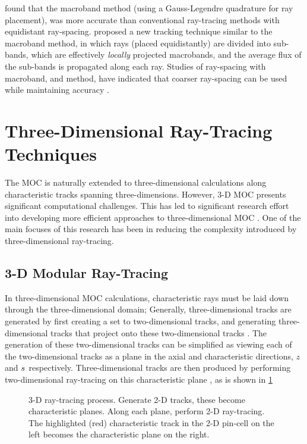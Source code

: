 {{        \citet{Yamamoto2005} found that the macroband method (using a Gauss-Legendre quadrature for ray placement), was more accurate than conventional ray-tracing methods with equidistant ray-spacing.
        \citet{Fevotte2007} proposed a new tracking technique similar to the macroband method, in which rays (placed equidistantly) are divided into sub-bands, which are effectively \emph{locally} projected macrobands, and the average flux of the sub-bands is propagated along each ray.
        Studies of ray-spacing with macroband, and  method, have indicated that coarser ray-spacing can be used while maintaining accuracy \cite{Yamamoto2005,Fevotte2007,Yamamoto2008}.
    }
    \section{Three-Dimensional Ray-Tracing Techniques}{\label{sec:RT:Three-Dimensional Ray-Tracing Techniques}
        The \ac{MOC} is naturally extended to three-dimensional calculations along characteristic tracks spanning three-dimensions.
        However, 3-D \ac{MOC} presents significant computational challenges.
        This has led to significant research effort into developing more efficient approaches to three-dimensional \ac{MOC} \cite{Kochunas2013,Tramm2016,Yamamoto2017,Graziano2017,Gunow2017}.
        One of the main focuses of this research has been in reducing the complexity introduced by three-dimensional ray-tracing.

        \subsection{3-D Modular Ray-Tracing}{\label{ssec:RT:3D Modular Ray-Tracing}
            In three-dimensional \ac{MOC} calculations, characteristic rays must be laid down through the three-dimensional domain;
            Generally, three-dimensional tracks are generated by first creating a set to two-dimensional tracks, and generating three-dimensional tracks that project onto these two-dimensional tracks \cite{Kochunas2013,Shaner2015}.
            The generation of these two-dimensional tracks can be simplified as viewing each of the two-dimensional tracks as a plane in the axial and characteristic directions, $z$ and $\len$ respectively.
            Three-dimensional tracks are then produced by performing two-dimensional ray-tracing on this characteristic plane \cite{Kochunas2013}, as is shown in \cref{fig:RT:3-D Ray-tracing}

            \begin{figure}[h]
                \centering
                \def\svgwidth{0.85\linewidth}
                
                \caption{3-D ray-tracing process. Generate 2-D tracks, these become characteristic planes. Along each plane, perform 2-D ray-tracing. The highlighted (red) characteristic track in the 2-D pin-cell on the left becomes the characteristic plane on the right.}
                \label{fig:RT:3-D Ray-tracing}
            \end{figure}

}}}
